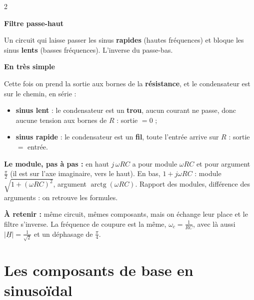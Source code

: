 \documentclass[a4paper,9pt]{extarticle}
\begin{document}
\begin{multicols}{2}
\begin{definition}

\textbf{Filtre passe-haut}

Un circuit qui laisse passer les sinus \textbf{rapides} (hautes fréquences) et bloque les sinus \textbf{lents} (basses fréquences). L'inverse du passe-bas.

\end{definition}


\begin{important}

\textbf{En très simple}

Cette fois on prend la sortie aux bornes de la \textbf{résistance}, et le condensateur est sur le chemin, en série :

\begin{itemize}

\item \textbf{sinus lent} : le condensateur est un \textbf{trou}, aucun courant ne passe, donc aucune tension aux bornes de $R$ : sortie $= 0$ ;

\item \textbf{sinus rapide} : le condensateur est un \textbf{fil}, toute l'entrée arrive sur $R$ : sortie $=$ entrée.

\end{itemize}

\textbf{Le module, pas à pas :} en haut $j\,\omega RC$ a pour module $\omega RC$ et pour argument $\frac{\pi}{2}$ (il est sur l'axe imaginaire, vers le haut). En bas, $1 + j\omega RC$ : module $\sqrt{1 + (\omega RC)^2}$, argument $\operatorname{arctg}(\omega RC)$. Rapport des modules, différence des arguments : on retrouve les formules.

\vspace{3pt}

\textbf{À retenir :} même circuit, mêmes composants, mais on échange leur place et le filtre s'inverse. La fréquence de coupure est la même, $\omega_c = \frac{1}{RC}$, avec là aussi $|\underline{H}| = \frac{1}{\sqrt 2}$ et un déphasage de $\frac{\pi}{4}$.

\end{important}


\section{Les composants de base en sinusoïdal}


\begin{center}


\end{center}
\end{multicols}
\end{document}
